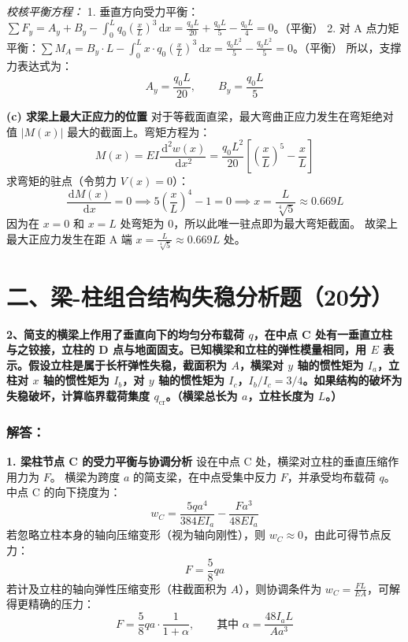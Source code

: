 \documentclass[UTF8,fontset=windows]{ctexart}
\newcommand{\diff}{\,\mathrm{d}}
\begin{document}
\textit{校核平衡方程：}
1.  垂直方向受力平衡：$\sum F_y = A_y + B_y - \int_0^L q_0 \left(\frac{x}{L}\right)^3 \diff x = \frac{q_0 L}{20} + \frac{q_0 L}{5} - \frac{q_0 L}{4} = 0$。（平衡）
2.  对 A 点力矩平衡：$\sum M_A = B_y \cdot L - \int_0^L x \cdot q_0 \left(\frac{x}{L}\right)^3 \diff x = \frac{q_0 L^2}{5} - \frac{q_0 L^2}{5} = 0$。（平衡）
所以，支撑力表达式为：
\[
    A_y = \frac{q_0 L}{20}, \qquad B_y = \frac{q_0 L}{5}
\]

\textbf{(c) 求梁上最大正应力的位置}
对于等截面直梁，最大弯曲正应力发生在弯矩绝对值 $|M(x)|$ 最大的截面上。弯矩方程为：
\[
    M(x) = EI \frac{\diff^2 w(x)}{\diff x^2} = \frac{q_0 L^2}{20} \left[ \left(\frac{x}{L}\right)^5 - \frac{x}{L} \right]
\]
求弯矩的驻点（令剪力 $V(x) = 0$）：
\[
    \frac{\diff M(x)}{\diff x} = 0 \implies 5\left(\frac{x}{L}\right)^4 - 1 = 0 \implies x = \frac{L}{\sqrt[4]{5}} \approx 0.669 L
\]
因为在 $x=0$ 和 $x=L$ 处弯矩为 0，所以此唯一驻点即为最大弯矩截面。
故梁上最大正应力发生在距 A 端 $x = \frac{L}{\sqrt[4]{5}} \approx 0.669 L$ 处。

\newpage

\section*{二、梁-柱组合结构失稳分析题（20分）}

\textbf{2、简支的横梁上作用了垂直向下的均匀分布载荷 $q$，在中点 C 处有一垂直立柱与之铰接，立柱的 D 点与地面固支。已知横梁和立柱的弹性模量相同，用 $E$ 表示。假设立柱是属于长杆弹性失稳，截面积为 $A$，横梁对 $y$ 轴的惯性矩为 $I_a$，立柱对 $x$ 轴的惯性矩为 $I_b$，对 $y$ 轴的惯性矩为 $I_c$，$I_b/I_c=3/4$。如果结构的破坏为失稳破坏，计算临界载荷集度 $q_{\text{cr}}$。（横梁总长为 $a$，立柱长度为 $L$。）}

\subsubsection*{解答：}

\textbf{1. 梁柱节点 C 的受力平衡与协调分析}
设在中点 C 处，横梁对立柱的垂直压缩作用力为 $F$。
横梁为跨度 $a$ 的简支梁，在中点受集中反力 $F$，并承受均布载荷 $q$。中点 C 的向下挠度为：
\[
    w_C = \frac{5 q a^4}{384 E I_a} - \frac{F a^3}{48 E I_a}
\]
若忽略立柱本身的轴向压缩变形（视为轴向刚性），则 $w_C \approx 0$，由此可得节点反力：
\[
    F = \frac{5}{8} q a
\]
若计及立柱的轴向弹性压缩变形（柱截面积为 $A$），则协调条件为 $w_C = \frac{F L}{E A}$，可解得更精确的压力：
\[
    F = \frac{5}{8} q a \cdot \frac{1}{1 + \alpha}, \qquad \text{其中 } \alpha = \frac{48 I_a L}{A a^3}
\]
\end{document}
